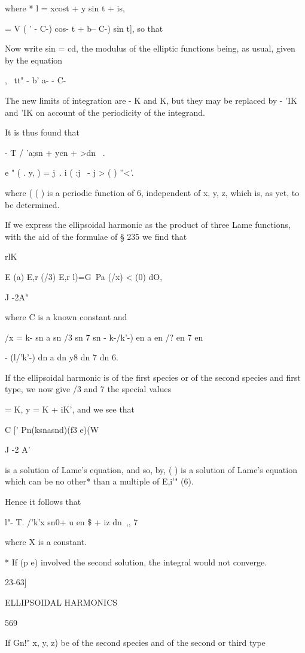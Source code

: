 {{{{{{{{where * l = xcost + y sin t + is,

  = V ( ' - C-) cos- t + b-- C-) sin t], so that

Now write sin = cd, the modulus of the elliptic functions being, as
usual, given by the equation

, \ tt" - b' a- - C-

The new limits of integration are - K and K, but they may be replaced
by - 'IK and 'IK on account of the periodicity of the integrand.

It is thus found that

 - T / 'a;sn + ycn + >dn \ .

e " ( . y, ) = j\ . i ( :j \ - j > ( ) ''<'.

where ( ( ) is a periodic function of 6, independent of x, y, z, which
is, as yet, to be determined.

If we express the ellipsoidal harmonic as the product of three Lame
functions, with the aid of the formulae of § 235 we find that

rlK

E (a) E,r (/3) E,r l)=G\ Pa (/x) < (0) dO,

J -2A"

where C is a known constant and

/x = k- sn a sn /3 sn 7 sn - k-/k'-) en a en /? en 7 en

- (l/'k'-) dn a dn y8 dn 7 dn 6.

If the ellipsoidal harmonic is of the first species or of the second
species and first type, we now give /3 and 7 the special values

  = K, y = K + iK', and we see that

C [' Pn(ksnasnd)(f3 e)(W

J -2 A'

is a solution of Lame's equation, and so, by, ( ) is a solution
of Lame's equation which can be no other* than a multiple of E,i'"
(6).

Hence it follows that

l"- T. /'k'x sn0+ u en \$ + iz dn \,,, 7

where X is a constant.

* If (p e) involved the second solution, the integral would not
converge.

23-63]

ELLIPSOIDAL HARMONICS

569

If Gn!" x, y, z) be of the second species and of the second or third
type

}}}}}}}}
